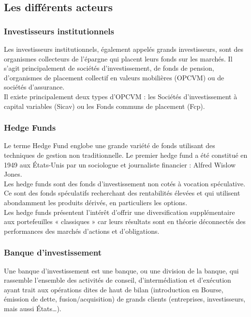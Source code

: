 \subsection{Les différents acteurs}

\subsubsection{Investisseurs institutionnels}
Les investisseurs institutionnels, également appelés grands investisseurs, sont des organismes collecteurs de l'épargne qui placent leurs fonds sur les marchés. Il s'agit principalement de sociétés d'investissement, de fonds de pension, d'organismes de placement collectif en valeurs mobilières (OPCVM) ou de sociétés d'assurance. \\

Il existe principalement deux types d'OPCVM : les Sociétés d'investissement à capital variables (Sicav) ou les Fonds communs de placement (Fcp). 

\subsubsection{Hedge Funds}
Le terme Hedge Fund englobe une grande variété de fonds utilisant des techniques de gestion non traditionnelle. Le premier hedge fund a été constitué en 1949 aux États-Unis par un sociologue et journaliste financier : Alfred Wislow Jones. \\

 Les hedge funds sont des fonds d'investissement non cotés à vocation spéculative. Ce sont des fonds spéculatifs recherchant des rentabilités élevées et qui utilisent abondamment les produits dérivés, en particuliers les options. \\

Les hedge funds présentent l'intérêt d'offrir une diversification supplémentaire aux portefeuilles « classiques » car leurs résultats sont en théorie déconnectés des performances des marchés d'actions et d'obligations. \\


\subsubsection{Banque d'investissement}
Une banque d'investissement est une banque, ou une division de la banque, qui rassemble l'ensemble des activités de conseil, d'intermédiation et d'exécution ayant trait aux opérations dites de haut de bilan (introduction en Bourse, émission de dette, fusion/acquisition) de grands clients (entreprises, investisseurs, mais aussi États…). \\

